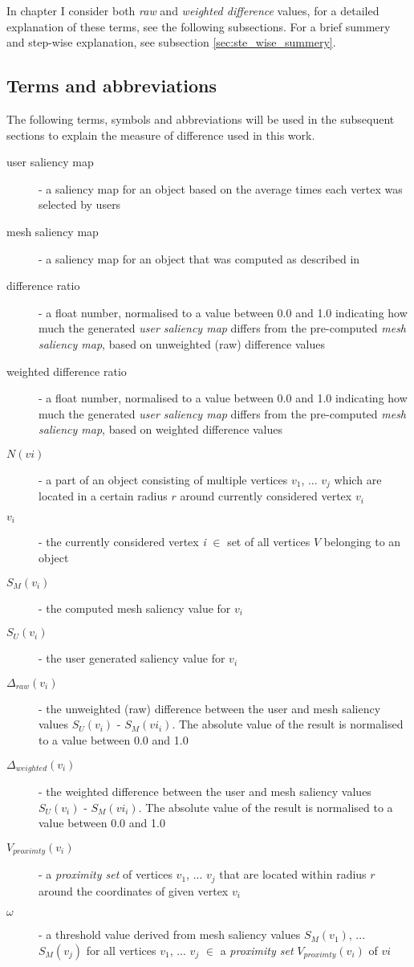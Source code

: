 In chapter %
I consider both \textit{raw} and \textit{weighted difference} values, for a detailed explanation of these terms, see the following subsections. For a brief summery and step-wise explanation, see subsection \ref{sec:ste_wise_summery}.

		\subsection{Terms and abbreviations}
		\label{sec:concept_terms_and_abbreviations}
The following terms, symbols and abbreviations will be used in the subsequent sections to explain the measure of difference used in this work.

\begin{description}
	\item [user saliency map] - a saliency map for an object based on the average times each vertex was selected by users
	\item [mesh saliency map] - a saliency map for an object that was computed as described in \cite{lee2005mesh}
	\item[difference ratio] - a float number, normalised to a value between 0.0 and 1.0 indicating how much the generated \textit{user saliency map} differs from the pre-computed \textit{mesh saliency map}, based on unweighted (raw) difference values
	\item[weighted difference ratio] - a float number, normalised to a value between 0.0 and 1.0 indicating how much the generated \textit{user saliency map} differs from the pre-computed \textit{mesh saliency map}, based on weighted difference values
	\item[$N(vi)$] - a part of an object consisting of multiple vertices $v_1$, ... $v_j$ which are located in a certain radius $r$ around currently considered vertex $v_i$
	\item[$v_i$] - the currently considered vertex \textit{i} $\in$ set of all vertices $V$ belonging to an object
	\item[$S_{M}(v_i)$] - the computed mesh saliency value for $v_i$
	\item[$S_{U}(v_i)$] - the user generated saliency value for $v_i$
	\item[$\Delta_{raw}(v_i)$] - the unweighted (raw) difference between the user and mesh saliency values $S_{U}(v_i)$ - $S_{M}(vi_i)$. The absolute value of the result is normalised to a value between 0.0 and 1.0
	\item[$\Delta_{weighted}(v_i)$] - the weighted difference between the user and mesh saliency values $S_{U}(v_i)$ - $S_{M}(vi_i)$. The absolute value of the result is normalised to a value between 0.0 and 1.0
	\item[$V_{proximty}(v_i)$] - a \textit{proximity set} of vertices $v_1$, ... $v_j$ that are located within radius $r$ around the coordinates of given vertex $v_i$
	\item[$\omega$] - a threshold value derived from mesh saliency values $S_{M}(v_1)$, ... $S_{M}(v_j)$ for all vertices $v_1$, ... $v_j$ $\in$ a \textit{proximity set} $V_{proximty}(v_i)$ of $vi$
\end{description}

